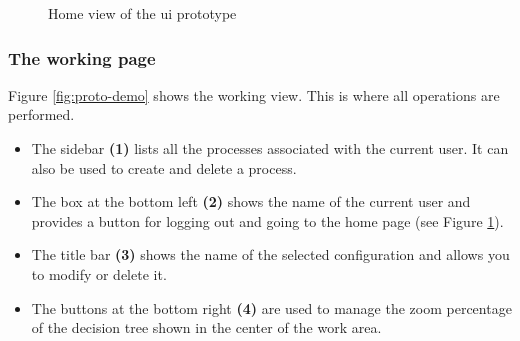     \begin{figure}[h]
    \centering
    \caption{\label{fig:proto-home}  Home view of the \acrshort{ui} prototype}
    \end{figure}
    
    
    \subsubsection{The working page}
    Figure \ref{fig:proto-demo} shows the working view. This is where all operations are performed. 
    
    \begin{itemize}
        \item The sidebar \textbf{(1)} lists all the processes associated with the current user. It can also be used to create and delete a process.
        \item The box at the bottom left \textbf{(2)} shows the name of the current user and provides a button for logging out and going to the home page (see Figure \ref{fig:proto-home}).
        \item The title bar \textbf{(3)} shows the name of the selected configuration and allows you to modify or delete it.
        \item The buttons at the bottom right \textbf{(4)} are used to manage the zoom percentage of the decision tree shown in the center of the work area.
    \end{itemize}
    
